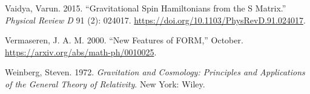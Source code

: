 \documentclass[
  11pt,
  a4paper,
  DIV=11,
  numbers=noendperiod,
  oneside]{scrreprt}
\newlength{\cslhangindent}
\newlength{\cslentryspacingunit} %
\newenvironment{CSLReferences}[2] %
 {%
  \setlength{\parindent}{0pt}
  \ifodd #1
  \let\oldpar\par
  \def\par{\hangindent=\cslhangindent\oldpar}
  \fi
  \setlength{\parskip}{#2\cslentryspacingunit}
 }%
 {}
\DeclareRobustCommand{\[}{\begin{equation}}
\DeclareRobustCommand{\]}{\end{equation}}
\begin{document}
\begin{CSLReferences}{1}{0}
\leavevmode{}%
Vaidya, Varun. 2015. {``Gravitational Spin {Hamiltonians} from the {S}
Matrix.''} \emph{Physical Review D} 91 (2): 024017.
\url{https://doi.org/10.1103/PhysRevD.91.024017}.

\leavevmode{}%
Vermaseren, J. A. M. 2000. {``New Features of {FORM},''} October.
\url{https://arxiv.org/abs/math-ph/0010025}.

\leavevmode{}%
Weinberg, Steven. 1972. \emph{Gravitation and Cosmology: Principles and
Applications of the General Theory of Relativity}. {New York}: {Wiley}.

\end{CSLReferences}
\end{document}
